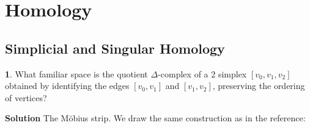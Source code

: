 \documentclass{article}
\begin{document}
\newpage

\section{Homology}

\subsection{Simplicial and Singular Homology}

\tab\textbf{1}. What familiar space is the quotient $\Delta$-complex of a 2 simplex $[v_{0}, v_{1}, v_{2}]$ obtained by identifying the edges $[v_{0}, v_{1}]$ and $[v_{1}, v_{2}]$, preserving the ordering of vertices?
\medskip

\textbf{Solution} The Möbius strip. We draw the same construction as in the reference:
\end{document}
